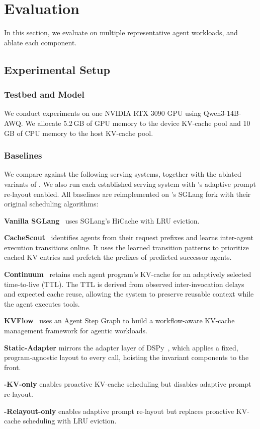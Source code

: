 \section{Evaluation}
\label{sec:eval}
In this section, we evaluate \sysname on multiple representative agent workloads, and ablate each component.
\subsection{Experimental Setup}
\subsubsection{Testbed and Model}
We conduct experiments on one NVIDIA RTX 3090 GPU using Qwen3-14B-AWQ. We allocate 5.2\,GB of GPU memory to the device KV-cache pool and 10\,GB of CPU memory to the host KV-cache pool.

\subsubsection{Baselines}
We compare \sysname against the following serving systems, together with the ablated variants of \sysname. We also run each established serving system with \sysname's adaptive prompt re-layout enabled. All baselines are reimplemented on \sysname's SGLang fork with their original scheduling algorithms:
\begin{enumerate*}[label=(\roman*)]
    \item \textbf{Vanilla SGLang}~\cite{zheng2024sglang} uses SGLang's HiCache with LRU eviction. 
    \item \textbf{CacheScout}~\cite{zhang2026cachescout} identifies agents from their request prefixes and learns inter-agent execution transitions online. It uses the learned transition patterns to prioritize cached KV entries and prefetch the prefixes of predicted successor agents.
    \item \textbf{Continuum}~\cite{li2025continuum} retains each agent program's KV-cache for an adaptively selected time-to-live (TTL). The TTL is derived from observed inter-invocation delays and expected cache reuse, allowing the system to preserve reusable context while the agent executes tools.
    \item \textbf{KVFlow}~\cite{pan2025kvflow} uses an Agent Step Graph to build a workflow-aware KV-cache management framework for agentic workloads.
    \item \textbf{Static-Adapter} mirrors the adapter layer of DSPy~\cite{dspy2026chatadapter}, which applies a fixed, program-agnostic layout to every call, hoisting the invariant components to the front.
    \item \textbf{\sysname-KV-only} enables proactive KV-cache scheduling but disables adaptive prompt re-layout.
    \item \textbf{\sysname-Relayout-only} enables adaptive prompt re-layout but replaces proactive KV-cache scheduling with LRU eviction.
\end{enumerate*} 


